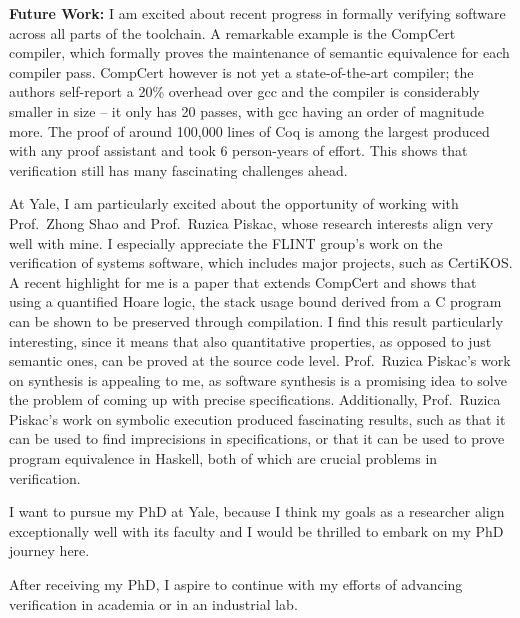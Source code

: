 \documentclass{article}
\newcommand{\school}{Yale\xspace}
\newcommand{\profOne}{Prof.\ Zhong Shao\xspace}
\newcommand{\profTwo}{Prof.\ Ruzica Piskac\xspace}
\begin{document}
\textbf{Future Work:}
I am excited about recent progress in formally verifying software across all parts of the toolchain. A remarkable example is the CompCert compiler, which formally proves the maintenance of semantic equivalence for each compiler pass. CompCert however is not yet a state-of-the-art compiler; the authors self-report a 20\% overhead over gcc and the compiler is considerably smaller in size -- it only has 20 passes, with gcc having an order of magnitude more. The proof of around 100,000 lines of Coq is among the largest produced with any proof assistant and took 6 person-years of effort. This shows that verification still has many fascinating challenges ahead.

At \school, I am particularly excited about the opportunity of working with \profOne and \profTwo, whose research interests align very well with mine. I especially appreciate the FLINT group's work on the verification of systems software, which includes major projects, such as CertiKOS. A recent highlight for me is a paper that extends CompCert and shows that using a quantified Hoare logic, the stack usage bound derived from a C program can be shown to be preserved through compilation. I find this result particularly interesting, since it means that also quantitative properties, as opposed to just semantic ones, can be proved at the source code level. \profTwo's work on synthesis is appealing to me, as software synthesis is a promising idea to solve the problem of coming up with precise specifications. Additionally, \profTwo's work on symbolic execution produced fascinating results, such as that it can be used to find imprecisions in specifications, or that it can be used to prove program equivalence in Haskell, both of which are crucial problems in verification.

I want to pursue my PhD at \school, because I think my goals as a researcher align exceptionally well with its faculty and I would be thrilled to embark on my PhD journey here.

After receiving my PhD, I aspire to continue with my efforts of advancing verification in academia or in an industrial lab.

\vspace{0.125in}
\end{document}
